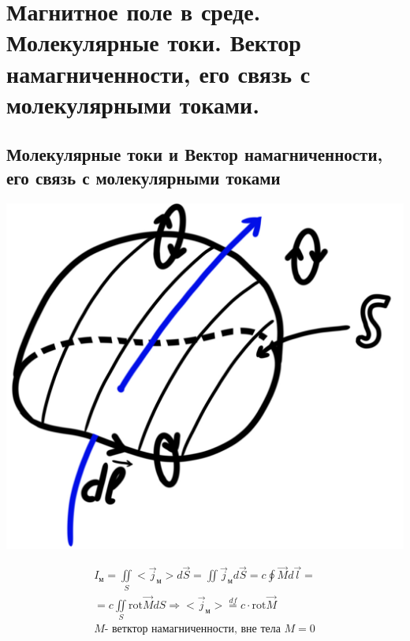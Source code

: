 \section{Магнитное поле в среде. Молекулярные токи. Вектор намагниченности,
его связь с молекулярными токами.}

\subsection*{Молекулярные токи и Вектор намагниченности,
его связь с молекулярными токами}

\begin{minipage}[c]{0.25\textwidth} %
    \includegraphics[width=\textwidth]{im/72.png} %
\end{minipage}%
\hfill
\begin{minipage}[c]{0.7\textwidth} %
    \begin{gather*}
        I_{\text{м}}=\underset{S}{\iint} <\vec{j}_{\text{м}}>d\vec{S}=\iint \vec{j}_{\text{м}}d\vec{S}=c\oint \vec{M}d\vec{l}= \\
        =c\underset{S}{\iint}\mathrm{rot}\vec{M}dS \Rightarrow <\vec{j}_{\text{м}}>\overset{df}{=}c\cdot \mathrm{rot}\vec{M} \\
        M\text{- ветктор намагниченности, вне тела } M=0
    \end{gather*}
\end{minipage}

